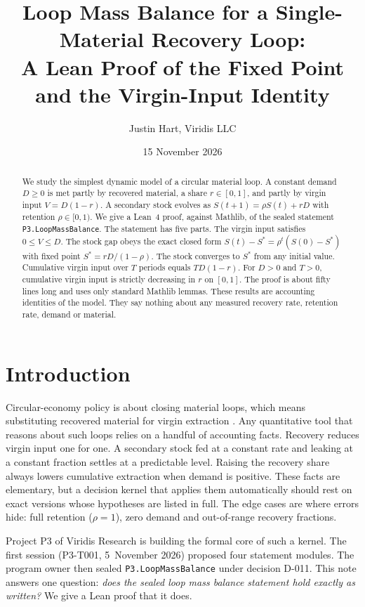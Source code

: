 \documentclass[11pt]{article}
\title{Loop Mass Balance for a Single-Material Recovery Loop:\\ A Lean Proof of the Fixed Point and the Virgin-Input Identity}
\author{Justin Hart, Viridis LLC}
\date{15 November 2026}
\theoremstyle{definition}
\theoremstyle{remark}
\begin{document}
\maketitle

\begin{abstract}
We study the simplest dynamic model of a circular material loop. A constant demand $D\ge0$ is
met partly by recovered material, a share $r\in[0,1]$, and partly by virgin input $V=D(1-r)$. A
secondary stock evolves as $S(t+1)=\rho S(t)+rD$ with retention $\rho\in[0,1)$. We give a Lean~4
proof, against Mathlib, of the sealed statement \texttt{P3.LoopMassBalance}. The statement has
five parts. The virgin input satisfies $0\le V\le D$. The stock gap obeys the exact closed form
$S(t)-S^\ast=\rho^t(S(0)-S^\ast)$ with fixed point $S^\ast=rD/(1-\rho)$. The stock converges to
$S^\ast$ from any initial value. Cumulative virgin input over $T$ periods equals $TD(1-r)$. For
$D>0$ and $T>0$, cumulative virgin input is strictly decreasing in $r$ on $[0,1]$. The proof is
about fifty lines long and uses only standard Mathlib lemmas. These results are accounting
identities of the model. They say nothing about any measured recovery rate, retention rate,
demand or material.
\end{abstract}

\section{Introduction}
Circular-economy policy is about closing material loops, which means substituting recovered
material for virgin extraction \citep{geissdoerfer2017}. Any quantitative tool that reasons
about such loops relies on a handful of accounting facts. Recovery reduces virgin input one for
one. A secondary stock fed at a constant rate and leaking at a constant fraction settles at a
predictable level. Raising the recovery share always lowers cumulative extraction when demand
is positive. These facts are elementary, but a decision kernel that applies them automatically
should rest on exact versions whose hypotheses are listed in full. The edge cases are where
errors hide: full retention ($\rho=1$), zero demand and out-of-range recovery fractions.

Project P3 of Viridis Research is building the formal core of such a kernel. The first session
(P3-T001, 5~November 2026) proposed four statement modules. The program owner then sealed
\texttt{P3.LoopMassBalance} under decision D-011. This note answers one question: \emph{does the
sealed loop mass balance statement hold exactly as written?} We give a Lean proof that it does.
\end{document}
